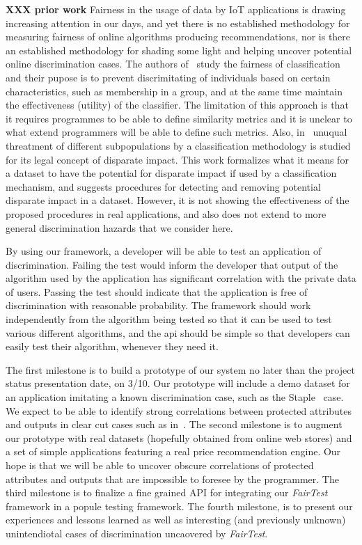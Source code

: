 \documentclass{article}
\newcommand{\thetool}{{\it FairTest}\xspace}
\newcommand{\heading}[1]{\noindent{\bf{#1}}}
\newcommand{\xxx}[1]{\textbf{{XXX} #1}}
\begin{document}
\heading{Prior Experience.}
\xxx{prior work}
Fairness in the usage of data by IoT applications is drawing
increasing attention in our days, and yet there is no established methodology
for measuring fairness of online algorithms producing recommendations, nor is
there an established methodology for shading some light and helping uncover
potential online discrimination cases.
The authors of~\cite{Fairness} study the fairness of classification and their pupose is
to prevent discrimitating of individuals based on certain characteristics, such as
membership in a group, and at the same time maintain the effectiveness (utility)
of the classifier. The limitation of this approach is that it requires programmes
to be able to define similarity metrics and it is unclear to what extend programmers
will be able to define such metrics.
Also, in~\cite{DisparateImpact} unuqual threatment of different subpopulations by a
classification methodology is studied for its legal concept of disparate impact.
This work formalizes what it means for a dataset to have the
potential for disparate impact if used by a classification mechanism,
and suggests procedures for detecting and removing
potential disparate impact in a dataset. However, it is not showing the
effectiveness of the proposed procedures in real applications, and also does
not extend to more general discrimination hazards that we consider here.


\heading{Expected Conclusions.}
By using our framework, a developer will be able to test an application of discrimination. Failing 
the test would inform the developer that output of the algorithm used by the application has 
significant correlation with the private data of users. Passing the test should indicate that the application 
is free of discrimination with reasonable probability. The framework should work independently from 
the algorithm being tested so that it can be used to test various different algorithms, and the api 
should be simple so that developers can easily test their algorithm, whenever they need it.

\heading{Research Plan.}
The first milestone is to build a prototype of our system no later than
the project status presentation date, on 3/10. Our prototype will include a
demo dataset for an application imitating a known discrimination case, such as
the Staple~\cite{Staples} case. We expect to be able to identify strong
correlations between protected attributes and outputs in clear cut cases such
as in~\cite{Staples}. The second milestone is to augment our prototype
with real datasets (hopefully obtained from online web stores) and a set of
simple applications featuring a real price recommendation engine. Our hope is
that we will be able to uncover obscure correlations of protected attributes
and outputs that are impossible to foresee by the programmer. The third
milestone is to finalize a fine grained API for integrating our \thetool
framework in a popule testing framework. The fourth milestone, is to present
our experiences and lessons learned as well as interesting (and previously
unknown) unintendiotal cases of discrimination uncaovered by \thetool.

{
  \scriptsize
  \setlength\itemsep{0pt}
  \footnotesize
  
  
}
\end{document}
